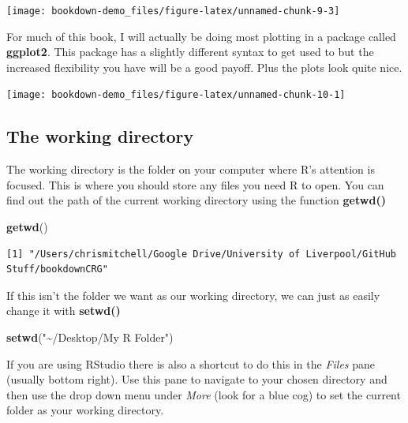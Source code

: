 \documentclass[
]{book}
\newenvironment{Shaded}{\begin{snugshade}}{\end{snugshade}}
\newcommand{\KeywordTok}[1]{\textcolor[rgb]{0.13,0.29,0.53}{\textbf{#1}}}
\newcommand{\NormalTok}[1]{#1}
\newcommand{\StringTok}[1]{\textcolor[rgb]{0.31,0.60,0.02}{#1}}
\begin{document}
\begin{center}\texttt{[image: bookdown-demo\_files/figure-latex/unnamed-chunk-9-3]} \end{center}

For much of this book, I will actually be doing most plotting in a package called \textbf{ggplot2}. This package has a slightly different syntax to get used to but the increased flexibility you have will be a good payoff. Plus the plots look quite nice.

\begin{center}\texttt{[image: bookdown-demo\_files/figure-latex/unnamed-chunk-10-1]} \end{center}

\hypertarget{the-working-directory}{%
\subsection{The working directory}\label{the-working-directory}}

The working directory is the folder on your computer where R's attention is focused. This is where you should store any files you need R to open. You can find out the path of the current working directory using the function \textbf{getwd()}

\begin{Shaded}
\begin{Highlighting}[]
\KeywordTok{getwd}\NormalTok{()}
\end{Highlighting}
\end{Shaded}

\begin{verbatim}
[1] "/Users/chrismitchell/Google Drive/University of Liverpool/GitHub Stuff/bookdownCRG"
\end{verbatim}

If this isn't the folder we want as our working directory, we can just as easily change it with \textbf{setwd()}

\begin{Shaded}
\begin{Highlighting}[]
\KeywordTok{setwd}\NormalTok{(}\StringTok{"\textasciitilde{}/Desktop/My R Folder"}\NormalTok{)}
\end{Highlighting}
\end{Shaded}

If you are using RStudio there is also a shortcut to do this in the \emph{Files} pane (usually bottom right). Use this pane to navigate to your chosen directory and then use the drop down menu under \emph{More} (look for a blue cog) to set the current folder as your working directory.
\end{document}
